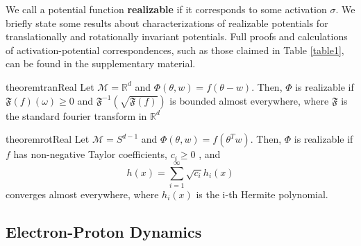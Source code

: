 \documentclass{article}
\newcommand{\R}{{\mathbb{R}}}
\begin{document}
We call a potential function {\bf realizable} if it corresponds to some activation $\sigma$.  We briefly state some results about characterizations of realizable potentials for translationally and rotationally invariant potentials. Full proofs and calculations of activation-potential correspondences, such as those claimed in Table \ref{table1}, can be found in the supplementary material. 
%
\begin{restatable}{theorem}{tranReal}
\label{thm:tranReal}
Let $\mathcal{M} = \R^d$ and $\Phi(\theta,w) = f(\theta - w)$. Then, $\Phi$ is realizable if $\mathfrak{F}(f)(\omega) \geq 0$ and $\mathfrak{F}^{-1}(\sqrt{\mathfrak{F}(f)})$ is bounded almost everywhere, where $\mathfrak{F}$ is the standard fourier transform in $\R^d$
\end{restatable}
%
\begin{restatable}{theorem}{rotReal}
\label{thm:rotReal}
Let $\mathcal{M} = S^{d-1}$ and $\Phi(\theta,w) = f(\theta^Tw)$. Then, $\Phi$ is realizable if $f$ has non-negative Taylor coefficients, $c_i \geq 0$ , and 
\[h(x) = \sum_{i=1}^\infty \sqrt{c_i} h_i(x)\]
converges almost everywhere, where $h_i(x)$ is the i-th Hermite polynomial.
\end{restatable}
%
\subsection{Electron-Proton Dynamics}
\end{document}
